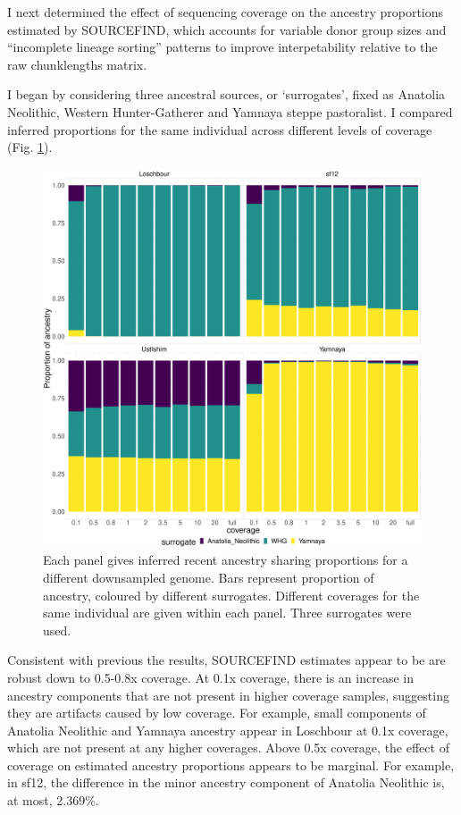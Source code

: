 I next determined the effect of sequencing coverage on the ancestry proportions estimated by SOURCEFIND, which accounts for variable donor group sizes and ``incomplete lineage sorting'' patterns to improve interpetability relative to the raw chunklengths matrix.

I began by considering three ancestral sources, or `surrogates', fixed as Anatolia Neolithic, Western Hunter-Gatherer and Yamnaya steppe pastoralist. I compared inferred proportions for the same individual across different levels of coverage (Fig. \ref{fig:3pop_SF_downsampled}). 

\begin{figure}[htp]
    \centering
    \includegraphics[width=1.0\textwidth]{../images/chapter1/3pop_SF_downsampled.pdf}
    \caption{Each panel gives inferred recent ancestry sharing proportions for a different downsampled genome. Bars represent proportion of ancestry, coloured by different surrogates. Different coverages for the same individual are given within each panel. Three surrogates were used.}
    \label{fig:3pop_SF_downsampled}
\end{figure}

Consistent with previous the results, SOURCEFIND estimates appear to be are robust down to 0.5-0.8x coverage. At 0.1x coverage, there is an increase in ancestry components that are not present in higher coverage samples, suggesting they are artifacts caused by low coverage. For example, small components of Anatolia Neolithic and Yamnaya ancestry appear in Loschbour at 0.1x coverage, which are not present at any higher coverages. Above 0.5x coverage, the effect of coverage on estimated ancestry proportions appears to be marginal. For example, in sf12, the difference in the minor ancestry component of Anatolia Neolithic is, at most, 2.369\%.


